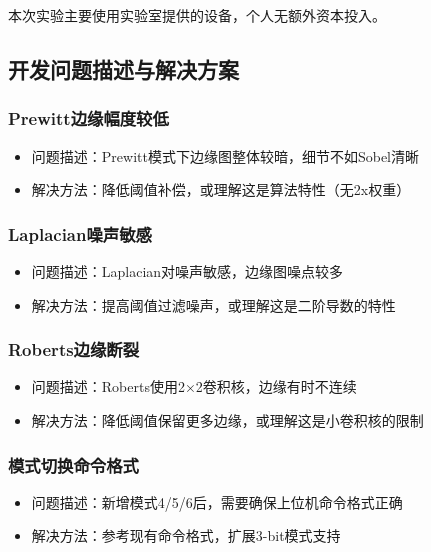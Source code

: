 本次实验主要使用实验室提供的设备，个人无额外资本投入。


\subsection{开发问题描述与解决方案}

\subsubsection{Prewitt边缘幅度较低}

\begin{itemize}
    \item 问题描述：Prewitt模式下边缘图整体较暗，细节不如Sobel清晰
    \item 解决方法：降低阈值补偿，或理解这是算法特性（无2x权重）
\end{itemize}



\subsubsection{Laplacian噪声敏感}

\begin{itemize}
    \item 问题描述：Laplacian对噪声敏感，边缘图噪点较多
    \item 解决方法：提高阈值过滤噪声，或理解这是二阶导数的特性
\end{itemize}



\subsubsection{Roberts边缘断裂}

\begin{itemize}
    \item 问题描述：Roberts使用2×2卷积核，边缘有时不连续
    \item 解决方法：降低阈值保留更多边缘，或理解这是小卷积核的限制
\end{itemize}



\subsubsection{模式切换命令格式}

\begin{itemize}
    \item 问题描述：新增模式4/5/6后，需要确保上位机命令格式正确
    \item 解决方法：参考现有命令格式，扩展3-bit模式支持
\end{itemize}



